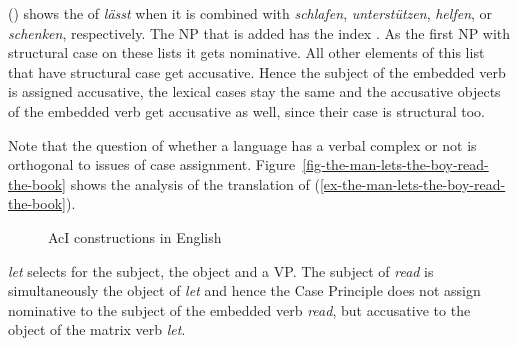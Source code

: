() shows the \argstl of \emph{lässt} when it is combined with \emph{schlafen},
\emph{unterstützen}, \emph{helfen}, or \emph{schenken}, respectively.
\ea
{}
\z
\largerpage[-1]
The NP that is added has the index . As the first NP with structural case on these lists it
gets nominative. All other elements of this list that have structural case get accusative. Hence the
subject of the embedded verb is assigned accusative, the lexical cases stay the same and the
accusative objects of the embedded verb get accusative as well, since their case is structural too.

Note that the question of whether a language has a verbal complex or not is orthogonal to issues of
case assignment. Figure~\vref{fig-the-man-lets-the-boy-read-the-book} shows the analysis of the  translation of (\ref{ex-the-man-lets-the-boy-read-the-book}).
\begin{figure}
\caption{\label{fig-the-man-lets-the-boy-read-the-book}AcI constructions in English}
\end{figure}
\emph{let} selects for the subject, the object and a VP. The subject of \emph{read} is
simultaneously the object of \emph{let} and hence the Case Principle does not assign nominative to
the subject of the embedded verb \emph{read}, but accusative to the object of the matrix verb \emph{let}.%

